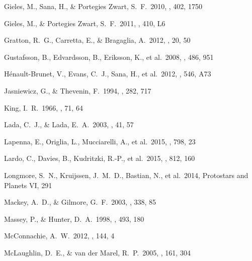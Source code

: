 \documentclass[useAMS,usenatbib]{mn2e}
\begin{document}
\begin{thebibliography}{99}
 Gieles, M., Sana, H.,
\& Portegies Zwart, S.~F.\ 2010, \mnras, 402, 1750

 Gieles, M., \& Portegies Zwart, S.~F.\ 2011, \mnras, 410, L6

 Gratton, R.~G., Carretta, E., \& Bragaglia, A.\ 2012, \aapr, 20, 50


 Gustafsson, B., Edvardsson, B., Eriksson, K., et al.\ 2008, \aap, 486, 951

 H{\'e}nault-Brunet, V., Evans, C.~J., Sana, H., et al.\ 2012, \aap, 546, A73

 Jasniewicz, G., \& Thevenin, F.\ 1994, \aap, 282, 717

 King, I.~R.\ 1966, \aj, 71, 64

 Lada, C.~J., \& Lada, E.~A.\ 2003, \araa, 41, 57

 Lapenna, E., Origlia,
L., Mucciarelli, A., et al.\ 2015, \apj, 798, 23

 Lardo, C., Davies, B.,
Kudritzki, R.-P., et al.\ 2015, \apj, 812, 160

 Longmore, S.~N.,
Kruijssen, J.~M.~D., Bastian, N., et al.\ 2014, Protostars and Planets VI, 291

 Mackey, A.~D., \& Gilmore, G.~F.\ 2003, \mnras, 338, 85

 Massey, P., \& Hunter, D.~A.\ 1998, \apj, 493, 180

 McConnachie, A.~W.\ 2012,
\aj, 144, 4

 McLaughlin, D.~E., \& van der Marel, R.~P.\ 2005, \apjs, 161, 304


\end{thebibliography}
\end{document}
